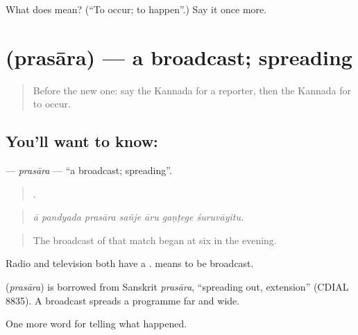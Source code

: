 \begin{tcolorbox}[breakable,colback=teal!4,colframe=teal!35!black,title={Before you move on}]
What does  mean? (\textquotedblleft{}To occur; to happen\textquotedblright{}.) Say it once more.
\end{tcolorbox}
\section[\texorpdfstring{\kn{ಪ್ರಸಾರ} (prasāra)}{ಪ್ರಸಾರ (prasāra)}]{ (prasāra) — a broadcast; spreading}

\label{lesson:KA-C320-prasara}



\begin{quote}
Before the new one: say the Kannada for a reporter, then the Kannada for to occur.
\end{quote}

\subsection*{You'll want to know: }
\textbf{} — \emph{prasāra} — \textquotedblleft{}a broadcast; spreading\textquotedblright{}.

\begin{quote}
      .
\end{quote}

\begin{quote}
\emph{ā pandyada prasāra sañje āru gaṇṭege śuruvāyitu.}
\end{quote}

\begin{quote}
The broadcast of that match began at six in the evening.
\end{quote}

Radio and television both have a .  means to be broadcast.

\begin{cousinweb}
\textbf{} (\emph{prasāra}) is borrowed from Sanskrit \emph{prasāra}, \textquotedblleft{}spreading out, extension\textquotedblright{} (CDIAL 8835). A broadcast spreads a programme far and wide.
\end{cousinweb}

\begin{grammarlens}[title={What you've built}]
One more word for telling what happened.
\end{grammarlens}

